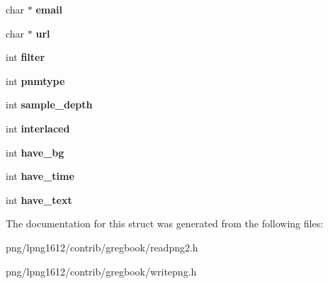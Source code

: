 \begin{DoxyCompactItemize}
\item 
\hypertarget{struct__mainprog__info_aed6d174ec9f9de2f35b7c8e96a1255dc}{char $\ast$ {\bfseries email}}\label{struct__mainprog__info_aed6d174ec9f9de2f35b7c8e96a1255dc}

\item 
\hypertarget{struct__mainprog__info_ab9a52438e6e7d09d7f103dfc489875fa}{char $\ast$ {\bfseries url}}\label{struct__mainprog__info_ab9a52438e6e7d09d7f103dfc489875fa}

\item 
\hypertarget{struct__mainprog__info_ac5e969e989116456e57c94d3af8c6a01}{int {\bfseries filter}}\label{struct__mainprog__info_ac5e969e989116456e57c94d3af8c6a01}

\item 
\hypertarget{struct__mainprog__info_aa25bf8ed28dde10b890bb44056159c41}{int {\bfseries pnmtype}}\label{struct__mainprog__info_aa25bf8ed28dde10b890bb44056159c41}

\item 
\hypertarget{struct__mainprog__info_a4484511d4b0778ebe724bbf2c6b943e3}{int {\bfseries sample\+\_\+depth}}\label{struct__mainprog__info_a4484511d4b0778ebe724bbf2c6b943e3}

\item 
\hypertarget{struct__mainprog__info_ada4148816c47251cee1fe26ce7683e36}{int {\bfseries interlaced}}\label{struct__mainprog__info_ada4148816c47251cee1fe26ce7683e36}

\item 
\hypertarget{struct__mainprog__info_a13a75828381686175b62795bb263f439}{int {\bfseries have\+\_\+bg}}\label{struct__mainprog__info_a13a75828381686175b62795bb263f439}

\item 
\hypertarget{struct__mainprog__info_ac742840576dedf6cb159a5eace93a6fe}{int {\bfseries have\+\_\+time}}\label{struct__mainprog__info_ac742840576dedf6cb159a5eace93a6fe}

\item 
\hypertarget{struct__mainprog__info_a5977cba5319c5e907cff2ce842720ccc}{int {\bfseries have\+\_\+text}}\label{struct__mainprog__info_a5977cba5319c5e907cff2ce842720ccc}

\end{DoxyCompactItemize}


The documentation for this struct was generated from the following files\+:\begin{DoxyCompactItemize}
\item 
png/lpng1612/contrib/gregbook/readpng2.\+h\item 
png/lpng1612/contrib/gregbook/writepng.\+h\end{DoxyCompactItemize}
